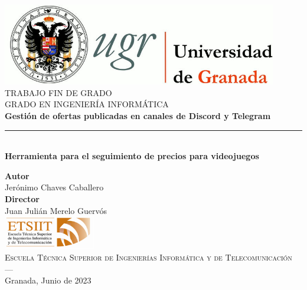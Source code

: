 \begin{titlepage}
\newlength{\centeroffset}
\setlength{\centeroffset}{-0.5\oddsidemargin}
\addtolength{\centeroffset}{0.5\evensidemargin}
\thispagestyle{empty}

\noindent\hspace*{\centeroffset}\begin{minipage}{\textwidth}

\centering
\includegraphics[width=0.9\textwidth]{logos/logo_ugr.jpg}\\[1.4cm]

\textsc{ \Large TRABAJO FIN DE GRADO\\[0.2cm]}
\textsc{ GRADO EN INGENIERÍA INFORMÁTICA}\\[1cm]

{\Huge\bfseries Gestión de ofertas publicadas en canales de Discord y Telegram \\}
\noindent\rule[-1ex]{\textwidth}{3pt}\\[3.5ex]
{\large\bfseries Herramienta para el seguimiento de precios para videojuegos }
\end{minipage}

\vspace{1.75cm}
\noindent\hspace*{\centeroffset}
\begin{minipage}{\textwidth}
\centering

\textbf{Autor}\\ {Jerónimo Chaves Caballero}\\[2.5ex]
\textbf{Director}\\ {Juan Julián Merelo Guervós}\\[1.75cm]
\includegraphics[width=0.3\textwidth]{logos/etsiit_logo.png}\\[0.1cm]
\textsc{Escuela Técnica Superior de Ingenierías Informática y de Telecomunicación}\\
\textsc{---}\\
Granada, Junio de 2023
\end{minipage}
\end{titlepage}
